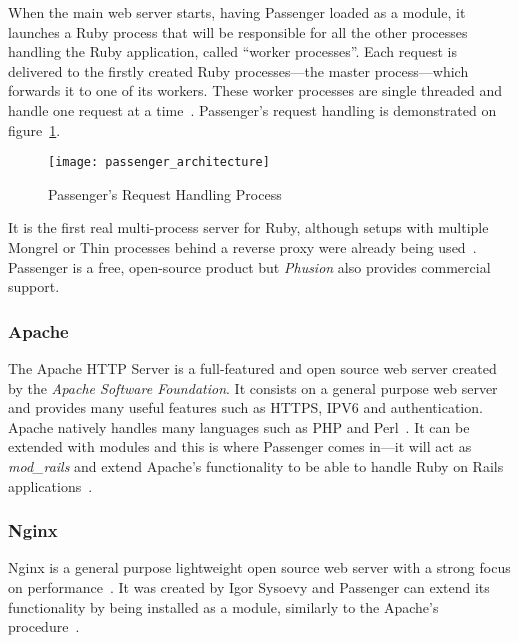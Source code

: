 When the main web server starts, having Passenger loaded as a module, it launches a Ruby process that will be responsible for all the other processes handling the Ruby application, called ``worker processes''. Each request is delivered to the firstly created Ruby processes---the master process---which forwards it to one of its workers. These worker processes are single threaded and handle one request at a time~\cite{ruby_webservers}. Passenger's request handling is demonstrated on figure~\ref{fig:passenger_architecture}.
\begin{figure}[h!t]
  \centering
    \texttt{[image: passenger\_architecture]}
    \caption{Passenger's Request Handling Process} \label{fig:passenger_architecture}
\end{figure}
It is the first real multi-process server for Ruby, although setups with multiple Mongrel or Thin processes behind a reverse proxy were already being used~\cite{passenger_whatis}. Passenger is a free, open-source product but \textit{Phusion} also provides commercial support.


\subsubsection{Apache}
The Apache HTTP Server is a full-featured and open source web server created by the \textit{Apache Software Foundation}. It consists on a general purpose web server and provides many useful features such as HTTPS, IPV6 and authentication. Apache natively handles many languages such as PHP and Perl~\cite{apache_features}. It can be extended with modules and this is where Passenger comes in---it will act as \textit{mod\_rails} and extend Apache's functionality to be able to handle Ruby on Rails applications~\cite{passenger_whatis}.


\subsubsection{Nginx}
Nginx is a general purpose lightweight open source web server with a strong focus on performance~\cite{nginx_features}. It was created by Igor Sysoevy and Passenger can extend its functionality by being installed as a module, similarly to the Apache's procedure~\cite{passenger_whatis}.


